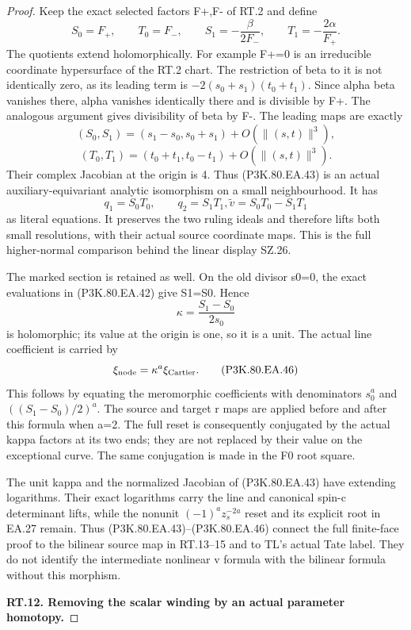 \begin{proof}
Keep the exact selected factors F+,F- of RT.2 and define
\[
 S_0=F_+,\qquad T_0=F_-,\qquad
 S_1=-\frac{\beta}{2F_-},\qquad
 T_1=-\frac{2\alpha}{F_+}.
 \tag{P3K.80.EA.43}
\]
The quotients extend holomorphically. For example F+=0 is an
irreducible coordinate hypersurface of the RT.2 chart. The
restriction of beta to it is not identically zero, as its leading
term is \(-2(s_0+s_1)(t_0+t_1)\). Since alpha beta vanishes
there, alpha vanishes identically there and is divisible by F+.
The analogous argument gives divisibility of beta by F-. The
leading maps are exactly
\[
 (S_0,S_1)=(s_1-s_0,s_0+s_1)+O(\|(s,t)\|^3),
\]
\[
 (T_0,T_1)=(t_0+t_1,t_0-t_1)+O(\|(s,t)\|^3).
\]
Their complex Jacobian at the origin is 4. Thus (P3K.80.EA.43) is an
actual auxiliary-equivariant analytic isomorphism on a small
neighbourhood. It has
\[
                 q_1=S_0T_0,\qquad q_2=S_1T_1,
                 \widetilde v=S_0T_0-S_1T_1
 \tag{P3K.80.EA.44}
\]
as literal equations. It preserves the two ruling ideals and
therefore lifts both small resolutions, with their actual source
coordinate maps. This is the full higher-normal comparison behind
the linear display SZ.26.

The marked section is retained as well. On the old divisor s0=0,
the exact evaluations in (P3K.80.EA.42) give S1=S0. Hence
\[
                \kappa=\frac{S_1-S_0}{2s_0}
 \tag{P3K.80.EA.45}
\]
is holomorphic; its value at the origin is one, so it is a unit.
The actual line coefficient is carried by
\[
                    \xi_{\rm node}=\kappa^a\xi_{\rm Cartier}.
 \tag{P3K.80.EA.46}
\]
This follows by equating the meromorphic coefficients with
denominators \(s_0^a\) and \(((S_1-S_0)/2)^a\).
The source and target r maps are applied before and after this
formula when a=2. The full reset is consequently conjugated by
the actual kappa factors at its two ends; they are not replaced
by their value on the exceptional curve. The same conjugation
is made in the F0 root square.

The unit kappa and the normalized Jacobian of (P3K.80.EA.43) have
extending logarithms. Their exact logarithms carry the line and
canonical spin-c determinant lifts, while the nonunit
\((-1)^a z_s^{-2a}\) reset and its explicit root in EA.27
remain. Thus (P3K.80.EA.43)--(P3K.80.EA.46) connect the full finite-face proof
to the bilinear source map in RT.13--15 and to TL's actual Tate
label. They do not identify the intermediate nonlinear v formula
with the bilinear formula without this morphism.

\par\medskip\noindent\textbf{RT.12. Removing the scalar winding by an actual parameter homotopy.}\par\nopagebreak[4]


\end{proof}
